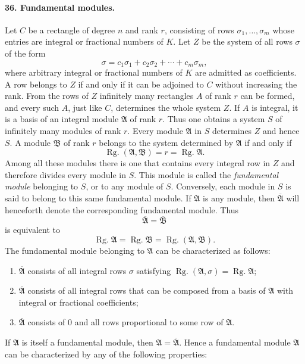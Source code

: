 \documentclass[11pt]{article}
\newcommand{\Rg}{\operatorname{Rg.}}
\begin{document}
\paragraph{36. Fundamental modules.}
Let $C$ be a rectangle of degree $n$ and rank $r$, consisting of rows $\sigma_1,
\ldots,
\sigma_m$ whose entries are integral or fractional numbers of $K$. Let $Z$ be the system of all rows $\sigma$ of the form
\[
\sigma=c_1\sigma_1+c_2\sigma_2+\cdots+c_m\sigma_m,
\]
where arbitrary integral or fractional numbers of $K$ are admitted as coefficients. A row belongs to $Z$ if and only if it can be adjoined to $C$ without increasing the rank. From the rows of $Z$ infinitely many rectangles $A$ of rank $r$ can be formed, and every such $A$, just like $C$, determines the whole system $Z$. If $A$ is integral, it is a basis of an integral module $\mathfrak A$ of rank $r$. Thus one obtains a system $S$ of infinitely many modules of rank $r$. Every module $\mathfrak A$ in $S$ determines $Z$ and hence $S$. A module $\mathfrak B$ of rank $r$ belongs to the system determined by $\mathfrak A$ if and only if
\[
\Rg(\mathfrak A,\mathfrak B)=r=\Rg\mathfrak A.
\]
Among all these modules there is one that contains every integral row in $Z$ and therefore divides every module in $S$. This module is called the \emph{fundamental module} belonging to $S$, or to any module of $S$. Conversely, each module in $S$ is said to belong to this same fundamental module. If $\mathfrak A$ is any module, then $\overline{\mathfrak A}$ will henceforth denote the corresponding fundamental module. Thus
\[
\overline{\mathfrak A}=\overline{\mathfrak B}
\]
is equivalent to
\[
\Rg\mathfrak A=\Rg\mathfrak B=\Rg(\mathfrak A,\mathfrak B).
\]
The fundamental module belonging to $\mathfrak A$ can be characterized as follows:
\begin{enumerate}
\item[a)] $\overline{\mathfrak A}$ consists of all integral rows $\sigma$ satisfying $\Rg(\mathfrak A,\sigma)=\Rg\mathfrak A$;
\item[b)] $\overline{\mathfrak A}$ consists of all integral rows that can be composed from a basis of $\mathfrak A$ with integral or fractional coefficients;
\item[c)] $\overline{\mathfrak A}$ consists of $0$ and all rows proportional to some row of $\mathfrak A$.
\end{enumerate}
If $\mathfrak A$ is itself a fundamental module, then $\mathfrak A=\overline{\mathfrak A}$. Hence a fundamental module $\mathfrak A$ can be characterized by any of the following properties:
\end{document}
